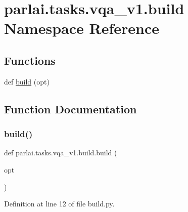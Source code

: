 \hypertarget{namespaceparlai_1_1tasks_1_1vqa__v1_1_1build}{}\section{parlai.\+tasks.\+vqa\+\_\+v1.\+build Namespace Reference}
\label{namespaceparlai_1_1tasks_1_1vqa__v1_1_1build}
\subsection*{Functions}
\begin{DoxyCompactItemize}
\item 
def \hyperlink{namespaceparlai_1_1tasks_1_1vqa__v1_1_1build_a183cd229fa87a5dacae8b5424819df18}{build} (opt)
\end{DoxyCompactItemize}


\subsection{Function Documentation}
\mbox{\label{namespaceparlai_1_1tasks_1_1vqa__v1_1_1build_a183cd229fa87a5dacae8b5424819df18}} 
\subsubsection{\texorpdfstring{build()}{build()}}
{\footnotesize\ttfamily def parlai.\+tasks.\+vqa\+\_\+v1.\+build.\+build (\begin{DoxyParamCaption}\item[{}]{opt }\end{DoxyParamCaption})}



Definition at line 12 of file build.\+py.

